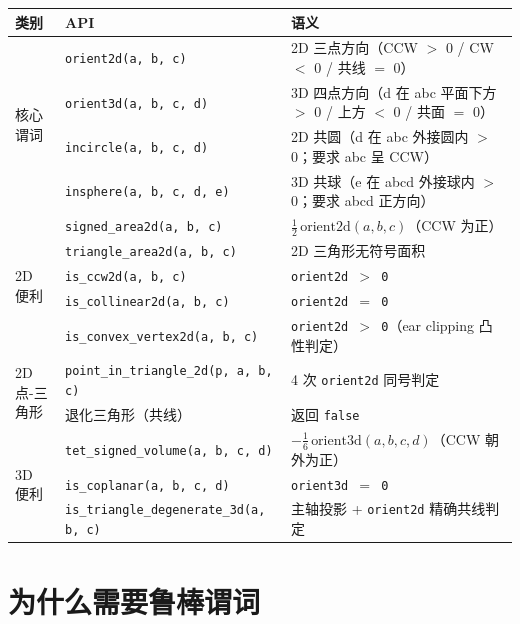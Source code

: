 \documentclass[11pt,a4paper]{article}
\begin{document}
\begin{center}
\renewcommand{\arraystretch}{1.18}
\begin{tabular}{@{}lll@{}}
  \toprule
  \textbf{类别} & \textbf{API} & \textbf{语义} \\
  \midrule
  \multirow{4}{*}{核心谓词}
    & \texttt{orient2d(a, b, c)}                 & 2D 三点方向（CCW $>$ 0 / CW $<$ 0 / 共线 $=$ 0） \\
    & \texttt{orient3d(a, b, c, d)}              & 3D 四点方向（d 在 abc 平面下方 $>$ 0 / 上方 $<$ 0 / 共面 $=$ 0） \\
    & \texttt{incircle(a, b, c, d)}              & 2D 共圆（d 在 abc 外接圆内 $>$ 0；要求 abc 呈 CCW） \\
    & \texttt{insphere(a, b, c, d, e)}           & 3D 共球（e 在 abcd 外接球内 $>$ 0；要求 abcd 正方向） \\
  \midrule
  \multirow{5}{*}{2D 便利}
    & \texttt{signed\_area2d(a, b, c)}           & $\tfrac{1}{2}\,\text{orient2d}(a,b,c)$（CCW 为正） \\
    & \texttt{triangle\_area2d(a, b, c)}         & 2D 三角形无符号面积 \\
    & \texttt{is\_ccw2d(a, b, c)}                & \texttt{orient2d $>$ 0} \\
    & \texttt{is\_collinear2d(a, b, c)}          & \texttt{orient2d $=$ 0} \\
    & \texttt{is\_convex\_vertex2d(a, b, c)}     & \texttt{orient2d $>$ 0}（ear clipping 凸性判定） \\
  \midrule
  \multirow{2}{*}{2D 点-三角形}
    & \texttt{point\_in\_triangle\_2d(p, a, b, c)} & 4 次 \texttt{orient2d} 同号判定 \\
    & 退化三角形（共线）                          & 返回 \texttt{false} \\
  \midrule
  \multirow{3}{*}{3D 便利}
    & \texttt{tet\_signed\_volume(a, b, c, d)}   & $-\tfrac{1}{6}\,\text{orient3d}(a,b,c,d)$（CCW 朝外为正） \\
    & \texttt{is\_coplanar(a, b, c, d)}          & \texttt{orient3d $=$ 0} \\
    & \texttt{is\_triangle\_degenerate\_3d(a, b, c)} & 主轴投影 + \texttt{orient2d} 精确共线判定 \\
  \bottomrule
\end{tabular}
\end{center}

\section{为什么需要鲁棒谓词}
\end{document}
